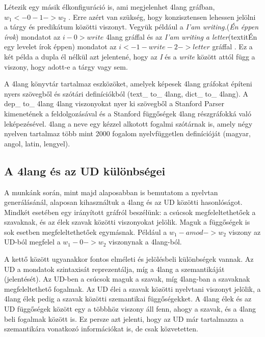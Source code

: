 Létezik egy másik élkonfiguráció is, ami megjelenhet 4lang gráfban, \textit{$w_1 <-0-1-> w_2$} . Erre azért van szükség, hogy konzisztensen lehessen jelölni a tárgy és predikátum közötti viszonyt. Vegyük például a \textit{I’am writing.}(\textit{Én éppen írok})  mondatot az \textit{$i -0> write$} 4lang gráffal és az \textit{I’am writing a letter}(textit{Én egy levelet írok éppen}) mondatot az \textit{$i <-1- write -2-> letter$} gráffal . Ez a két példa a dupla él nélkül azt jelentené, hogy  az \textit{I} és a \textit{write} között attól függ a viszony, hogy adott-e a tárgy vagy sem. \cite{Recski:2018}

A 4lang könyvtár tartalmaz eszközöket, amelyek képesek 4lang gráfokat építeni nyers szövegből és szótári definíciókból (text\_ to\_ 4lang, dict\_ to\_ 4lang). A dep\_ to\_ 4lang 4lang viszonyokat nyer ki szövegből a Stanford Parser \cite{DeMarneffe:2006} kimenetének a feldolgozásával és a Stanford függőségek 4lang részgráfokká való leképezésével.
4lang a neve egy kézzel alkotott  fogalmi szótárnak is, amely négy nyelven tartalmaz több mint 2000 fogalom nyelvfüggetlen definícióját (magyar, angol, latin, lengyel). \cite{Kornai:2013}


\subsection{A 4lang és az UD különbségei}
\label{sec:4LvsUD}
A munkánk során, mint majd alaposabban is bemutatom a nyelvtan generálásánál, alaposan kihasználtuk a 4lang és az UD közötti hasonlóságot. Mindkét esetében egy irányított gráfról beszélünk: a csúcsok megfeleltethetőek a szavaknak, és az élek szavak közötti viszonyokat jelölik. Maguk a függőségek is sok esetben megfeleltethetőek egymásnak. Például a \textit{$w_1 -amod-> w_2$} viszony az UD-ból megfelel a \textit{$w_1 -0-> w_2$} viszonynak a 4lang-ból.

A kettő között ugyanakkor fontos elméleti és jelölésbeli különbségek vannak. Az UD a mondatok szintaxisát reprezentálja, míg a 4lang a szemantikáját (jelentését). Az UD-ben a csúcsok maguk a szavak, míg 4lang-ban a szavaknak megfeleltethető fogalmak. Az UD élei a szavak közötti nyelvtani viszonyt jelölik, a 4lang élek pedig a szavak közötti szemantikai függőségekket. A 4lang élek és az UD függőségek között egy a többhöz viszony áll fenn, ahogy a szavak, és a 4lang beli fogalmak között is. Ez persze azt jelenti, hogy az UD már tartalmazza a szemantikára vonatkozó információkat is, de csak közvetetten.

